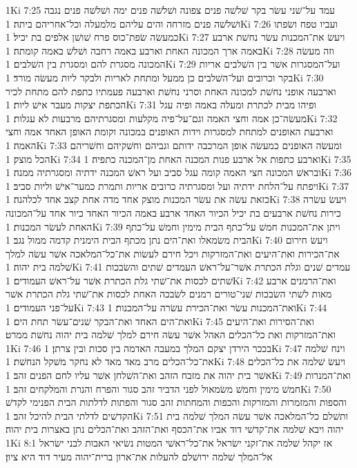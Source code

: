 1Ki 7:25  עמד על־שׁני עשׂר בקר שׁלשׁה פנים צפונה ושׁלשׁה פנים ימה ושׁלשׁה פנים נגבה ושׁלשׁה פנים מזרחה והים עליהם מלמעלה וכל־אחריהם ביתה׃
1Ki 7:26  ועביו טפח ושׂפתו כמעשׂה שׂפת־כוס פרח שׁושׁן אלפים בת יכיל׃
1Ki 7:27  ויעשׂ את־המכנות עשׂר נחשׁת ארבע באמה ארך המכונה האחת וארבע באמה רחבה ושׁלשׁ באמה קומתה׃
1Ki 7:28  וזה מעשׂה המכונה מסגרת להם ומסגרת בין השׁלבים׃
1Ki 7:29  ועל־המסגרות אשׁר בין השׁלבים אריות בקר וכרובים ועל־השׁלבים כן ממעל ומתחת לאריות ולבקר ליות מעשׂה מורד׃
1Ki 7:30  וארבעה אופני נחשׁת למכונה האחת וסרני נחשׁת וארבעה פעמתיו כתפת להם מתחת לכיר הכתפת יצקות מעבר אישׁ ליות׃
1Ki 7:31  ופיהו מבית לכתרת ומעלה באמה ופיה עגל מעשׂה־כן אמה וחצי האמה וגם־על־פיה מקלעות ומסגרתיהם מרבעות לא עגלות׃
1Ki 7:32  וארבעת האופנים למתחת למסגרות וידות האופנים במכונה וקומת האופן האחד אמה וחצי האמה׃
1Ki 7:33  ומעשׂה האופנים כמעשׂה אופן המרכבה ידותם וגביהם וחשׁקיהם וחשׁריהם הכל מוצק׃
1Ki 7:34  וארבע כתפות אל ארבע פנות המכנה האחת מן־המכנה כתפיה׃
1Ki 7:35  ובראשׁ המכונה חצי האמה קומה עגל סביב ועל ראשׁ המכנה ידתיה ומסגרתיה ממנה׃
1Ki 7:36  ויפתח על־הלחת ידתיה ועל ומסגרתיה כרובים אריות ותמרת כמער־אישׁ וליות סביב׃
1Ki 7:37  כזאת עשׂה את עשׂר המכנות מוצק אחד מדה אחת קצב אחד לכלהנה׃
1Ki 7:38  ויעשׂ עשׂרה כירות נחשׁת ארבעים בת יכיל הכיור האחד ארבע באמה הכיור האחד כיור אחד על־המכונה האחת לעשׂר המכנות׃
1Ki 7:39  ויתן את־המכנות חמשׁ על־כתף הבית מימין וחמשׁ על־כתף הבית משׂמאלו ואת־הים נתן מכתף הבית הימנית קדמה ממול נגב׃
1Ki 7:40  ויעשׂ חירום את־הכירות ואת־היעים ואת־המזרקות ויכל חירם לעשׂות את־כל־המלאכה אשׁר עשׂה למלך שׁלמה בית יהוה׃
1Ki 7:41  עמדים שׁנים וגלת הכתרת אשׁר־על־ראשׁ העמדים שׁתים והשׂבכות שׁתים לכסות את־שׁתי גלת הכתרת אשׁר על־ראשׁ העמודים׃
1Ki 7:42  ואת־הרמנים ארבע מאות לשׁתי השׂבכות שׁני־טורים רמנים לשׂבכה האחת לכסות את־שׁתי גלת הכתרת אשׁר על־פני העמודים׃
1Ki 7:43  ואת־המכנות עשׂר ואת־הכירת עשׂרה על־המכנות׃
1Ki 7:44  ואת־הים האחד ואת־הבקר שׁנים־עשׂר תחת הים׃
1Ki 7:45  ואת־הסירות ואת־היעים ואת־המזרקות ואת כל־הכלים האהל אשׁר עשׂה חירם למלך שׁלמה בית יהוה נחשׁת ממרט׃
1Ki 7:46  בככר הירדן יצקם המלך במעבה האדמה בין סכות ובין צרתן׃
1Ki 7:47  וינח שׁלמה את־כל־הכלים מרב מאד מאד לא נחקר משׁקל הנחשׁת׃
1Ki 7:48  ויעשׂ שׁלמה את כל־הכלים אשׁר בית יהוה את מזבח הזהב ואת־השׁלחן אשׁר עליו לחם הפנים זהב׃
1Ki 7:49  ואת־המנרות חמשׁ מימין וחמשׁ משׂמאול לפני הדביר זהב סגור והפרח והנרת והמלקחים זהב׃
1Ki 7:50  והספות והמזמרות והמזרקות והכפות והמחתות זהב סגור והפתות לדלתות הבית הפנימי לקדשׁ הקדשׁים לדלתי הבית להיכל זהב׃
1Ki 7:51  ותשׁלם כל־המלאכה אשׁר עשׂה המלך שׁלמה בית יהוה ויבא שׁלמה את־קדשׁי דוד אביו את־הכסף ואת־הזהב ואת־הכלים נתן באצרות בית יהוה׃
1Ki 8:1  אז יקהל שׁלמה את־זקני ישׂראל את־כל־ראשׁי המטות נשׂיאי האבות לבני ישׂראל אל־המלך שׁלמה ירושׁלם להעלות את־ארון ברית־יהוה מעיר דוד היא ציון׃
